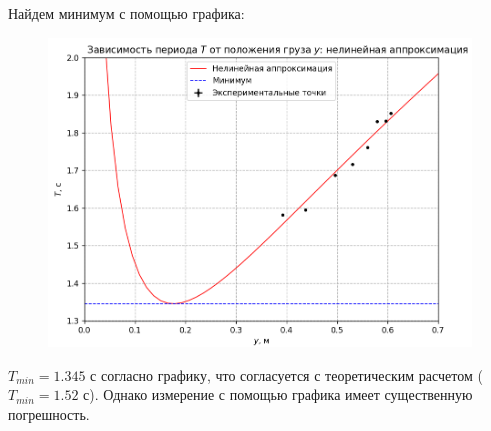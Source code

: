 \documentclass[a4paper,12pt]{article}
\begin{document}
Найдем минимум с помощью графика:
\begin{figure}[H]
\begin{center}
\includegraphics[width=1\textwidth]{T(a)+min}
\end{center}
\end{figure}

$T_{min} = 1.345 $ с согласно графику, что согласуется с теоретическим расчетом ($T_{min} = 1.52$ с). Однако измерение с помощью графика имеет существенную погрешность.
\end{document}
